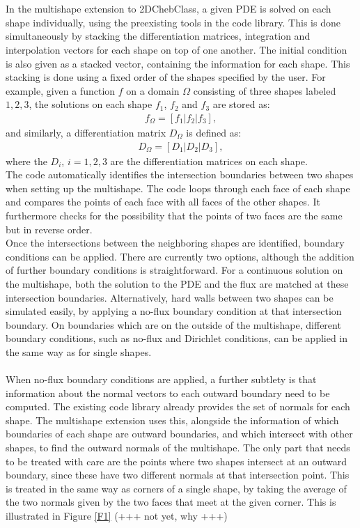 \documentclass[11pt, a4paper]{article}
\theoremstyle{definition}
\begin{document}
\\
\\
In the multishape extension to 2DChebClass, a given PDE is solved on each shape individually, using the preexisting tools in the code library.
This is done simultaneously by stacking the differentiation matrices, integration and interpolation vectors for each shape on top of one another. The initial condition is also given as a stacked vector, containing the information for each shape. This stacking is done using a fixed order of the shapes specified by the user. 
For example, given a function $f$ on a domain $\Omega$ consisting of three shapes labeled $1,2,3$, the solutions on each shape $f_1$, $f_2$ and $f_3$ are stored as:
\begin{align*}
	f_\Omega = [f_1 | f_2 | f_3],
\end{align*}
and similarly, a differentiation matrix $D_\Omega$ is defined as:
\begin{align*}
	D_\Omega = [D_1 | D_2 | D_3],
\end{align*}
where the $D_i$, $i = 1, 2, 3$ are the differentiation matrices on each shape.
\\
The code automatically identifies the intersection boundaries between two shapes when setting up the multishape. The code loops through each face of each shape and compares the points of each face with all faces of the other shapes. It furthermore checks for the possibility that the points of two faces are the same but in reverse order. 
\\
Once the intersections between the neighboring shapes are identified, boundary conditions can be applied. There are currently two options, although the addition of further boundary conditions is straightforward. For a continuous solution on the multishape, both the solution to the PDE and the flux are matched at these intersection boundaries. Alternatively, hard walls between two shapes can be simulated easily, by applying a no-flux boundary condition at that intersection boundary. On boundaries which are on the outside of the multishape, different boundary conditions, such as no-flux and Dirichlet conditions, can be applied in the same way as for single shapes.
\\
\\
When no-flux boundary conditions are applied, a further subtlety is that information about the normal vectors to each outward boundary need to be computed. The existing code library already provides the set of normals for each shape. The multishape extension uses this, alongside the information of which boundaries of each shape are outward boundaries, and which intersect with other shapes, to find the outward normals of the multishape. The only part that needs to be treated with care are the points where two shapes intersect at an outward boundary, since these have two different normals at that intersection point. This is treated in the same way as corners of a single shape, by taking the average of the two normals given by the two faces that meet at the given corner. This is illustrated in Figure \ref{F1} (+++ not yet, why +++)
\end{document}
